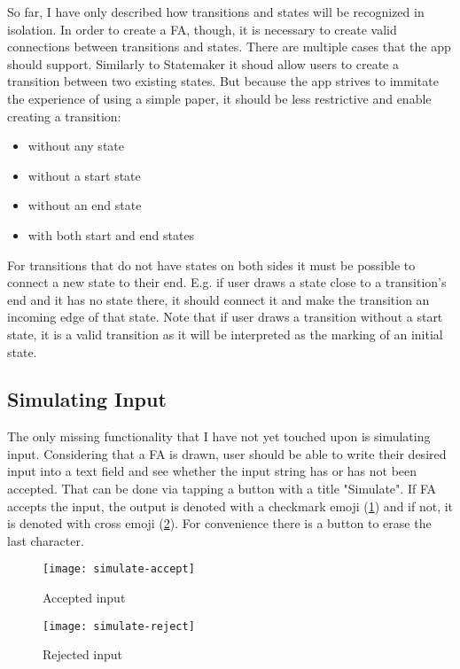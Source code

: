 So far, I have only described how transitions and states will be recognized in isolation. In order to create a FA, though, it is necessary to create valid connections between transitions and states. There are multiple cases that the app should support. Similarly to Statemaker \cite{state-maker} it shoud allow users to create a transition between two existing states. But because the app strives to immitate the experience of using a simple paper, it should be less restrictive and enable creating a transition:
\begin{itemize}
    \item without any state
    \item without a start state
    \item without an end state
    \item with both start and end states
\end{itemize}
For transitions that do not have states on both sides it must be possible to connect a new state to their end. E.g. if user draws a state close to a transition's end and it has no state there, it should connect it and make the transition an incoming edge of that state. Note that if user draws a transition without a start state, it is a valid transition as it will be interpreted as the marking of an initial state.

\subsection{Simulating Input}

The only missing functionality that I have not yet touched upon is simulating input. Considering that a FA is drawn, user should be able to write their desired input into a text field and see whether the input string has or has not been accepted. That can be done via tapping a button with a title "Simulate". If FA accepts the input, the output is denoted with a checkmark emoji (\ref{simulate-accept}) and if not, it is denoted with cross emoji (\ref{simulate-reject}). For convenience there is a button to erase the last character.

\begin{figure}
    \texttt{[image: simulate-accept]}
    \caption{Accepted input}\label{simulate-accept}
\end{figure}

\begin{figure}
    \texttt{[image: simulate-reject]}
    \caption{Rejected input}\label{simulate-reject}
\end{figure}

